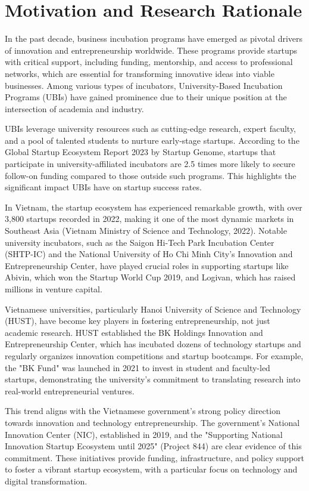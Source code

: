 \documentclass[../Main.tex]{subfiles}
\begin{document}
	\section{Motivation and Research Rationale}
	\label{section:1.1_Motivation_and_research_rationale}
	In the past decade, business incubation programs have emerged as pivotal drivers of innovation and entrepreneurship worldwide. These programs provide startups with critical support, including funding, mentorship, and access to professional networks, which are essential for transforming innovative ideas into viable businesses. Among various types of incubators, University-Based Incubation Programs (UBIs) have gained prominence due to their unique position at the intersection of academia and industry.

	UBIs leverage university resources such as cutting-edge research, expert faculty, and a pool of talented students to nurture early-stage startups. According to the Global Startup Ecosystem Report 2023 by Startup Genome, startups that participate in university-affiliated incubators are 2.5 times more likely to secure follow-on funding compared to those outside such programs. This highlights the significant impact UBIs have on startup success rates.

	In Vietnam, the startup ecosystem has experienced remarkable growth, with over 3,800 startups recorded in 2022, making it one of the most dynamic markets in Southeast Asia (Vietnam Ministry of Science and Technology, 2022). Notable university incubators, such as the Saigon Hi-Tech Park Incubation Center (SHTP-IC) and the National University of Ho Chi Minh City's Innovation and Entrepreneurship Center, have played crucial roles in supporting startups like Abivin, which won the Startup World Cup 2019, and Logivan, which has raised millions in venture capital.

	Vietnamese universities, particularly Hanoi University of Science and Technology (HUST), have become key players in fostering entrepreneurship, not just academic research. HUST established the BK Holdings Innovation and Entrepreneurship Center, which has incubated dozens of technology startups and regularly organizes innovation competitions and startup bootcamps. For example, the "BK Fund" was launched in 2021 to invest in student and faculty-led startups, demonstrating the university's commitment to translating research into real-world entrepreneurial ventures.

	This trend aligns with the Vietnamese government's strong policy direction towards innovation and technology entrepreneurship. The government's National Innovation Center (NIC), established in 2019, and the "Supporting National Innovation Startup Ecosystem until 2025" (Project 844) are clear evidence of this commitment. These initiatives provide funding, infrastructure, and policy support to foster a vibrant startup ecosystem, with a particular focus on technology and digital transformation.
\end{document}
